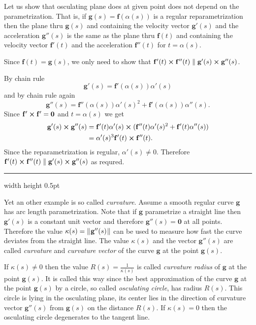 \begin{exmp} Let us show that osculating plane does at given point does not depend on the parametrization.
That is, if $\mathbf{g}(s)=\mathbf{f}(\alpha(s))$ is a regular reparametrization then 
the plane thru $\mathbf{g}(s)$ and containing the velocity vector $\mathbf{g}'(s)$ and the acceleration $\mathbf{g}''(s)$
is the same as  
the plane thru $\mathbf{f}(t)$ and containing the velocity vector $\mathbf{f}'(t)$ and the acceleration $\mathbf{f}''(t)$
for $t=\alpha(s)$.

Since $\mathbf{f}(t)=\mathbf{g}(s)$, 
we only need to show that
$\mathbf{f}'(t) \bm{\times} \mathbf{f}''(t)\parallel\mathbf{g}'(s) \bm{\times} \mathbf{g}''(s)$.

By chain rule
\[\mathbf{g}'(s)=\mathbf{f}'(\alpha(s))\alpha'(s)\] 
and by chain rule again
\[\mathbf{g}''(s)=\mathbf{f}''(\alpha(s))\alpha'(s)^2+\mathbf{f}'(\alpha(s))\alpha''(s).\] 
Since $\mathbf{f}' \bm{\times} \mathbf{f}'=\mathbf{0}$ and $t=\alpha(s)$ we get
\begin{align*}
\mathbf{g}'(s) \bm{\times} \mathbf{g}''(s)
&
=\mathbf{f}'(t)\alpha'(s) \bm{\times} (\mathbf{f}''(t)\alpha'(s)^2+\mathbf{f}'(t)\alpha''(s))
\\
&=
\alpha'(s)^3\mathbf{f}'(t) \bm{\times} \mathbf{f}''(t).
\end{align*}
Since the reparametrization is regular, $\alpha'(s)\ne0$.
Therefore $\mathbf{f}'(t) \bm{\times} \mathbf{f}''(t)\parallel\mathbf{g}'(s) \bm{\times} \mathbf{g}''(s)$ as requred.
\end{exmp}
\hrule width \textwidth height 0.5pt
\medskip

Yet an other example is so called \emph{curvature}. 
Assume a smooth regular curve $\mathbf{g}$ has arc length parametrization.
Note that if $\mathbf{g}$ para\-met\-rize a straight line 
then $\mathbf{g}'(s)$ is a constant unit vector and therefore $\mathbf{g}''(s)=\mathbf{0}$ at all points.
Therefore the value $\kappa(s)=\lVert\mspace{1mu}\mathbf{g}''(s)\mspace{1mu}\rVert$ can be used to measure how fast the curve deviates from the straight line.
The value $\kappa(s)$ and the vector $\mathbf{g}''(s)$ are called \emph{curvature} and \emph{curvature vector} of the curve $\mathbf{g}$ at the point $\mathbf{g}(s)$.

If $\kappa(s)\ne 0$ then the value $R(s)=\tfrac1{\kappa(s)}$
is called \emph{curvature radius} of $\mathbf{g}$ at the point $\mathbf{g}(s)$. 
It is called this way since the best approximation of the curve $\mathbf{g}$ at the point $\mathbf{g}(s)$ by a circle, so called \emph{osculating circle}, has radius $R(s)$.
This circle is lying in the osculating plane,
its center lies in the direction of curvature vector $\mathbf{g}''(s)$ from $\mathbf{g}(s)$ on the distance $R(s)$.
If $\kappa(s)=0$ then the osculating circle degenerates to the tangent line.

